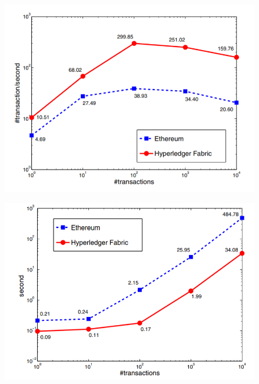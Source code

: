 \documentclass{VUMIFPSkursinis}
\begin{document}
\begin{figure}
\centering
\begin{minipage}{.5\textwidth}
  \centering
  \includegraphics[width=1\linewidth]{img/TwoPraeinamumas}
  \label{fig:test1}
\end{minipage}%
\begin{minipage}{.5\textwidth}
  \centering
  \includegraphics[width=1\linewidth]{img/TwoVelavimas}
  \label{fig:test2}
\end{minipage}
\end{figure}
\end{document}
